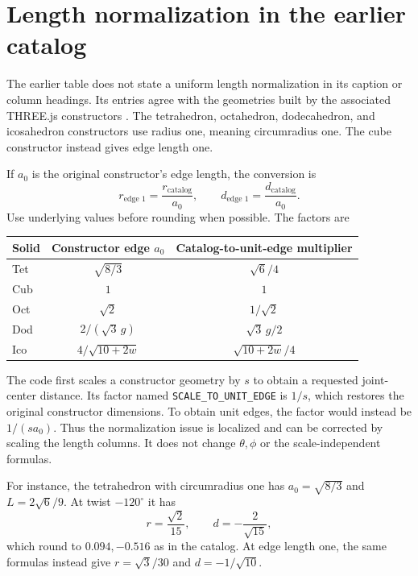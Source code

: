 \documentclass[11pt]{article}
\theoremstyle{definition}
\newcommand{\degc}{^{\circ}}
\begin{document}
\section{Length normalization in the earlier catalog}\label{sec:scale}
The earlier table does not state a uniform length normalization in its
caption or column headings. Its entries agree with the geometries built by
the associated THREE.js constructors \cite{repository}. The tetrahedron,
octahedron, dodecahedron, and icosahedron constructors use radius one, meaning
circumradius one. The cube constructor instead gives edge length one.

If $a_0$ is the original constructor's edge length, the conversion is
\begin{equation}\label{eq:conversion}
 r_{\text{edge }1}=\frac{r_{\mathrm{catalog}}}{a_0},
 \qquad d_{\text{edge }1}=\frac{d_{\mathrm{catalog}}}{a_0}.
\end{equation}
Use underlying values before rounding when possible. The factors are
\begin{center}
\renewcommand{\arraystretch}{1.35}
\begin{tabular}{@{}lcc@{}}
\toprule
Solid & Constructor edge $a_0$ & Catalog-to-unit-edge multiplier\\
\midrule
Tet & $\sqrt{8/3}$ & $\sqrt6/4$\\
Cub & $1$ & $1$\\
Oct & $\sqrt2$ & $1/\sqrt2$\\
Dod & $2/(\sqrt3\,g)$ & $\sqrt3\,g/2$\\
Ico & $4/\sqrt{10+2w}$ & $\sqrt{10+2w}/4$\\
\bottomrule
\end{tabular}
\end{center}
The code first scales a constructor geometry by $s$ to obtain a requested
joint-center distance. Its factor named \texttt{SCALE\_TO\_UNIT\_EDGE} is
$1/s$, which restores the original constructor dimensions. To obtain unit
edges, the factor would instead be $1/(sa_0)$. Thus the normalization issue
is localized and can be corrected by scaling the length columns. It does not
change $\theta,\phi$ or the scale-independent formulas.

For instance, the tetrahedron with circumradius one has
$a_0=\sqrt{8/3}$ and $L=2\sqrt6/9$. At twist $-120\degc$ it has
\[
 r=\frac{\sqrt2}{15},\qquad d=-\frac2{\sqrt{15}},
\]
which round to $0.094,-0.516$ as in the catalog. At edge length one, the
same formulas instead give $r=\sqrt3/30$ and $d=-1/\sqrt{10}$.
\end{document}

